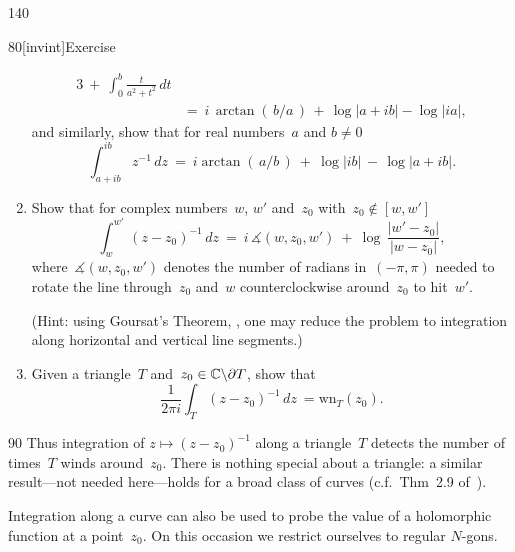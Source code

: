 \begin{parsec}{140}
\begin{point}{80}[invint]{Exercise}
\begin{enumerate}
\begin{alignat*}{3}
	\ +\ 
	\int_0^b \frac{t}{a^2+t^2}\,dt\\
	\ &=\ 
	\textstyle
	i\,\arctan(\,b/a\,)
	\,+\, \log\left|a+ib\right| - \log\left|ia\right|,
\end{alignat*}
and similarly, show that for real numbers~$a$ and $b\neq 0$
\begin{equation*}
	\int_{a+ib}^{ib} z^{-1}\,dz
	\ = \ 
	i\arctan(\,a/b\,) \ +\ 
	\log\left|ib\right| \,-\,
	\log\left|a+ib\right|.
\end{equation*}
	\item
Show that for complex numbers~$w$, $w'$ and~$z_0$
with~$z_0\notin [w,w']$
\begin{equation*}
	\int_{w}^{w'}\,(z-z_0)^{-1}\,dz
\ = \ 
i\, \measuredangle(w,z_0,w')\ +\ 
\log\,\frac{\left|w'-z_0\right|}{\left|w-z_0\right|},
\end{equation*}
where~$\measuredangle(w,z_0,w')$
denotes
the number of radians
in~$(-\pi,\pi)$
needed
to rotate the line through~$z_0$ and~$w$
counterclockwise around~$z_0$ to hit~$w'$.

(Hint: 
using Goursat's Theorem, ,
one may reduce the problem
to integration along horizontal and vertical line segments.)
\item
Given a triangle~$T$ and~$z_0\in\mathbb{C}\backslash \partial T$,
show that
\begin{equation*}
	\frac{1}{2\pi i}\int_T (z-z_0)^{-1}\,dz
	\ =  \mathrm{wn}_T(z_0).
\end{equation*}
\end{enumerate}
\end{point}
\begin{point}{90}%
Thus integration of 
$z\mapsto (z-z_0)^{-1}$
along a triangle~$T$ detects
the number of times~$T$ winds
around~$z_0$.
There is nothing special about a triangle:
a similar result---not needed here---holds
for a broad class of curves
(c.f.~Thm~2.9 of~\cite{conway2013}).

Integration along a curve can also be used
to probe the value of a holomorphic function at a point~$z_0$.
On this occasion
we restrict ourselves
to regular $N$-gons.
\end{point}
\end{parsec}%
